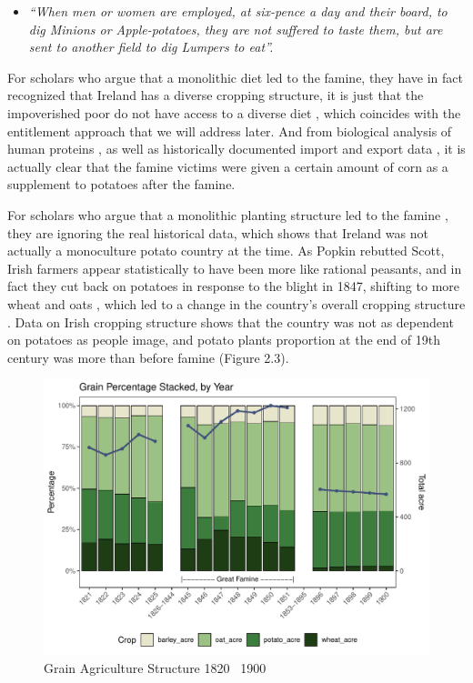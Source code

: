 \begin{itemize}
    \item [] \textit{``When men or women are employed, at six-pence a day and their board, to dig Minions or Apple-potatoes, they are not suffered to taste them, but are sent to another field to dig Lumpers to eat''.}\citep{grada1995ireland}
\end{itemize}

For scholars who argue that a monolithic diet led to the famine, they have in fact recognized that Ireland has a diverse cropping structure, it is just that the impoverished poor do not have access to a diverse diet \citep{braa1997great, nally2008coming, de1998famine, kinealy2006great}, which coincides with the entitlement approach that we will address later. And from biological analysis of human proteins \citep{beaumont2014isotopic, beaumont2013victims}, as well as historically documented import and export data \citep{fairlie1965nineteenth}, it is actually clear that the famine victims were given a certain amount of corn as a supplement to potatoes after the famine.

For scholars who argue that a monolithic planting structure led to the famine \citep{turner2002after, bartoletti2001black}, they are ignoring the real historical data, which shows that Ireland was not actually a monoculture potato country at the time. As Popkin rebutted Scott, Irish farmers appear statistically to have been more like rational peasants, and in fact they cut back on potatoes in response to the blight in 1847, shifting to more wheat and oats \citep{o1952food} , which led to a change in the country's overall cropping structure \citep{clarkson2001feast}. Data on Irish cropping structure shows that the country was not as dependent on potatoes as people image, and potato plants proportion at the end of 19th century was more than before famine (Figure 2.3).

\begin{figure}[htbp]
    \centering
    \caption{Grain Agriculture Structure 1820 \textendash\ 1900}
    \includegraphics[width=.95\textwidth]{../03_outputs/food_structure.pdf}
\end{figure}


